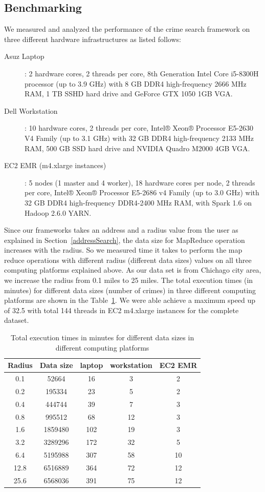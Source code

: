 \subsection{Benchmarking}
We measured and analyzed the performance of the crime search framework
on three different hardware infrastructures as listed follows:
\begin{description}
	\item[Asuz Laptop]: 2 hardware cores, 2 threads per core, 8th
	Generation Intel Core i5-8300H processor (up to 3.9 GHz) with
	8 GB DDR4 high-frequency 2666 MHz RAM, 1 TB SSHD hard drive
	and GeForce GTX 1050 1GB VGA.
        \item[Dell Workstation]: 10
	hardware cores, 2 threads per core, Intel® Xeon® Processor
	E5-2630 V4 Family (up to 3.1 GHz) with 32 GB DDR4
	high-frequency 2133 MHz RAM, 500 GB SSD hard drive and NVIDIA
	Quadro M2000 4GB VGA.
        \item[EC2 EMR (m4.xlarge instances)]: 5
	nodes (1 master and 4 worker), 18 hardware cores per node, 2
	threads per core, Intel® Xeon® Processor E5-2686 v4 Family (up
	to 3.0 GHz) with 32 GB DDR4 high-frequency DDR4-2400 MHz RAM,
	with Spark 1.6 on Hadoop 2.6.0 YARN.
\end{description}

Since our frameworks takes an address and a radius value from the user
as explained in Section~\ref{addressSearch}, the data size for
MapReduce operation increases with the radius. So we measured time it
takes to perform the map reduce operations with different radius
(different data sizes) values on all three computing platforms
explained above. As our data set is from Chichago city area, we
increase the radius from 0.1 miles to 25 miles. The total execution
times (in minutes) for different data sizes (number of crimes) in
three different computing platforms are shown in the
Table~\ref{tab:performance}. We were able achieve a maximum speed up
of 32.5 with total 144 threads in EC2 m4.xlarge instances for the
complete dataset.

\begin{table}[]
	\centering
	\caption{Total execution times in minutes for different data sizes in different computing platforms}\label{tab:performance}
	\begin{tabular}{*{5}{c}}
		\toprule
		Radius & Data size &  laptop & workstation &  EC2 EMR \\
		\midrule
		0.1 & 52664  & 16  & 3 &  2 \\
		0.2 & 195334 & 23  & 5 &  2 \\
		0.4 & 444744 & 39  & 7 &  3 \\
		0.8 & 995512 & 68  & 12 &  3 \\
		1.6 & 1859480 & 102  & 19 &  3 \\
		3.2 & 3289296 & 172  & 32 &  5 \\
		6.4 & 5195988 &  307 & 58 &  10 \\
		12.8 & 6516889 & 364  & 72 &  12 \\
		25.6 & 6568036 & 391  & 75 &  12 \\

		\bottomrule
	\end{tabular}
\end{table}

